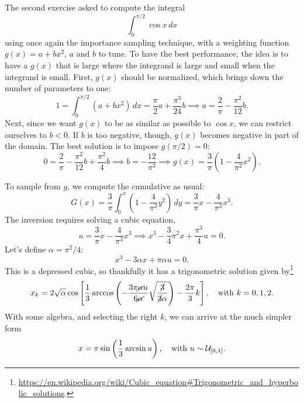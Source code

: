 The second exercise asked to compute the integral
\begin{equation}
    \int_{0}^{\pi/2} \cos x \, dx
\end{equation}
using once again the importance sampling technique, with a weighting function
$g(x) = a + bx^2$, $a$ and $b$ to tune. To have the best performance, the idea
is to have a $g(x)$ that is large where the integrand is large and small when
the integrand is small. First, $g(x)$ should be normalized, which brings down the
number of parameters to one:
\begin{equation}
    1 = \int_{0}^{\pi/2} (a + bx^{2})\, dx = \frac{\pi}{2}a +
    \frac{\pi^{3}}{24}b \implies a = \frac{2}{\pi} - \frac{\pi^{2}}{12}b.
\end{equation}
Next, since we want $g(x)$ to be as similar as possible to $\cos x$, we can
restrict ourselves to $b < 0$. If $b$ is too negative, though, $g(x)$ becomes
negative in part of the domain. The best solution is to impose $g(\pi/2) = 0$:
\begin{equation}
    0 = \frac{2}{\pi} - \frac{\pi^{2}}{12}b + \frac{\pi^{2}}{4}b
    \implies b = -\frac{12}{\pi^{3}}
    \implies g(x) = \frac{3}{\pi}\left(1 - \frac{4}{\pi^{2}}x^{2}\right).
\end{equation}

To sample from $g$, we compute the cumulative as usual:
\begin{equation}
    G(x) = \frac{3}{\pi} \int_{0}^{x} \left(1 - \frac{4}{\pi^{2}}y^{2}\right)\,
    dy = \frac{3}{\pi}x - \frac{4}{\pi^{3}}x^{3}.
\end{equation}
The inversion requires solving a cubic equation,
\begin{equation}
    u = \frac{3}{\pi} x - \frac{4}{\pi^{3}}x^{3}
    \implies x^{3} - \frac{3}{4} \pi^{2}x + \frac{\pi^{3}}{4} u = 0.
\end{equation}
Let’s define $\alpha = \pi^{2}/4$:
\begin{equation}
    x^{3} - 3\alpha x + \pi \alpha u = 0.
\end{equation}
This is a depressed cubic, so thankfully it has a trigonometric solution given
by\footnote{\url{https://en.wikipedia.org/wiki/Cubic_equation\#Trigonometric_and_hyperbolic_solutions}.}
\begin{equation}
    x_k = 2 \sqrt{\alpha}
    \cos\left[\frac{1}{3}\arccos\left(-\frac{3\pi\cancel{\alpha}
    u}{6\cancel{\alpha}} \sqrt{\frac{\cancel{3}}{\cancel{3}\alpha}}\right) -
    \frac{2\pi}{3}k \right], \quad \text{with } k = 0, 1, 2.
\end{equation}
With some algebra, and selecting the right $k$, we can arrive at the much simpler form
\begin{equation}
    x = \pi \sin\left(\frac{1}{3} \arcsin u\right), \quad
    \text{with } u \sim \mathcal{U}_{[0, 1]}.
    \label{eq:x~a+bx2}
\end{equation}

